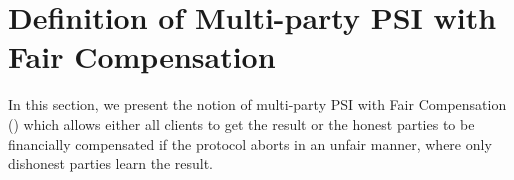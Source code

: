 

\section{Definition of Multi-party PSI with Fair Compensation}\label{sec::F-PSI-model}%





In this section, we present the notion of multi-party PSI with Fair Compensation  (\p) which allows either all clients to get the result or the honest parties to be financially compensated if the protocol aborts in an unfair manner, where only dishonest parties learn the result.  




 
 
 
 
 
 
